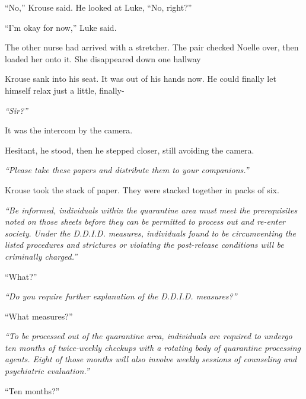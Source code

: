 ``No,'' Krouse said.  He looked at Luke, ``No, right?''



``I'm okay for now,'' Luke said.



The other nurse had arrived with a stretcher.  The pair checked Noelle over, then loaded her onto it.  She disappeared down one hallway



Krouse sank into his seat.  It was out of his hands now.  He could finally let himself relax just a little, finally-



\emph{``Sir?''}



It was the intercom by the camera.



Hesitant, he stood, then he stepped closer, still avoiding the camera.



\emph{``Please take these papers and distribute them to your companions.''}



Krouse took the stack of paper.  They were stacked together in packs of six.



\emph{``Be informed, individuals within the quarantine area must meet the prerequisites noted on those sheets before they can be permitted to process out and re-enter society}.  \emph{Under the D.D.I.D. measures, individuals found to be circumventing the listed procedures and strictures or violating the post-release conditions will be criminally charged.''}



``What?''



\emph{``Do you require further explanation of the D.D.I.D. measures?''}



``What measures?''



\emph{``To be processed out of the quarantine area, individuals are required to undergo ten months of twice-weekly checkups with a rotating body of quarantine processing agents.  Eight of those months will also involve weekly sessions of counseling and psychiatric evaluation.''}



``Ten months?''



